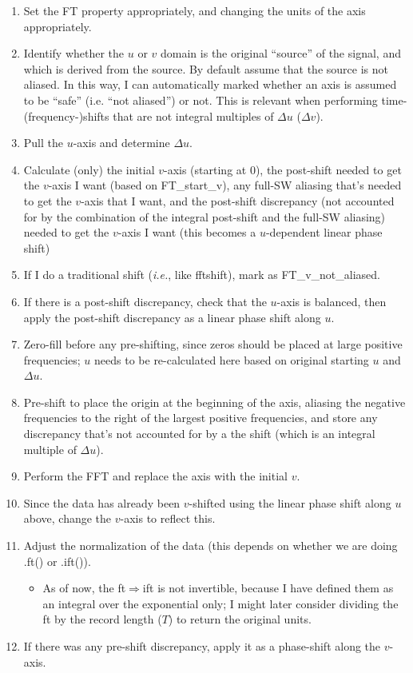 \begin{enumerate}
    \tightlist
    \item Set the FT property appropriately, and changing the units of the axis appropriately.
    \item Identify whether the \(u\) or \(v\) domain is the original ``source'' of the signal,
            and which is derived from the source.
        By default assume that the source is not aliased.
        In this way, I can automatically marked whether an axis is
            assumed to be ``safe'' (i.e. ``not aliased'') or not.
        This is relevant when performing time-(frequency-)shifts that
            are not integral multiples of \(\Delta u\) (\(\Delta v\)).
    \item Pull the \(u\)-axis and determine \(\Delta u\).
    \item Calculate (only) the initial \(v\)-axis (starting at 0),
        the post-shift needed to get the \(v\)-axis I want (based on FT\_start\_v),
        any full-SW aliasing that's needed to get the \(v\)-axis that I want,
        and the post-shift discrepancy (not accounted for by the combination of
        the integral post-shift and the full-SW aliasing) needed to get the
        \(v\)-axis I want (this becomes a \(u\)-dependent linear phase shift)
    \item If I do a traditional shift (\emph{i.e.}, like fftshift), mark as FT\_v\_not\_aliased.
    \item If there is a post-shift discrepancy, check that the \(u\)-axis is
        balanced, then apply the post-shift discrepancy as a linear phase shift
        along \(u\).
    \item Zero-fill before any pre-shifting, since zeros should be placed at large positive frequencies;
        \(u\) needs to be re-calculated here based
        on original starting \(u\) and \(\Delta u\).
    \item Pre-shift to place the origin at the beginning of the axis, aliasing
        the negative frequencies to the right of the largest positive
        frequencies, and store any discrepancy that's not accounted for by a
        the shift (which is an integral multiple of \(\Delta u\)).
    \item Perform the FFT and replace the axis with the initial \(v\).
    \item Since the data has already been \(v\)-shifted using the linear phase
        shift along \(u\) above, change the \(v\)-axis to reflect this.
    \item Adjust the normalization of the data (this depends on whether we are doing .ft() or .ift()).
        \begin{itemize}
            \tightlist
            \item As of now, the ft\(\Rightarrow\)ift is not invertible,
                because I have defined them as an integral over the exponential
                only; I might later consider dividing the ft by the record
                length (\(T\)) to return the original units.
        \end{itemize}
    \item If there was any pre-shift discrepancy, apply it as a phase-shift along the \(v\)-axis.
\end{enumerate}

